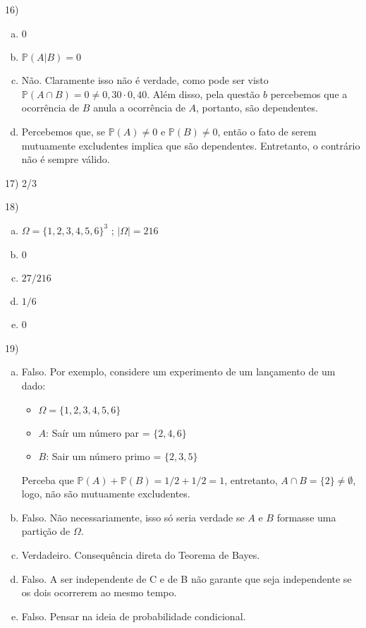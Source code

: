 \documentclass{article}
\begin{document}
16) 

\begin{enumerate}[a)]
    \item 0
    \item $\mathds{P}(A|B) = 0$
    \item Não. Claramente isso não é verdade, como pode ser visto $\mathds{P}(A \cap B) = 0 \neq 0,30 \cdot 0,40$. Além disso, pela questão $b$ percebemos que a ocorrência de $B$ anula a ocorrência de $A$, portanto, são dependentes. 
    \item Percebemos que, se $\mathds{P}(A) \neq 0$ e $\mathds{P}(B) \neq 0$, então o fato de serem mutuamente excludentes implica que são dependentes. Entretanto, o contrário não é sempre válido. 
\end{enumerate}

17) 2/3

18) 
\begin{enumerate}[a)]
    \item $\Omega = \{1,2,3,4,5,6\}^3$ ; $|\Omega| = 216$
    \item 0
    \item $27/216$
    \item $1/6$
    \item 0
\end{enumerate}

19) 
\begin{enumerate}[a)]
    \item Falso. Por exemplo, considere um experimento de um lançamento de um dado:
    \begin{itemize}
        \item $\Omega = \{1,2,3,4,5,6\}$
        \item $A$: Saír um número par = $\{2,4,6\}$
        \item $B$: Sair um número primo = $\{2,3,5\}$
    \end{itemize}

    Perceba que $\mathds{P}(A) + \mathds{P}(B) = 1/2 + 1/2 = 1$, entretanto, $A \cap B = \{2\} \neq \emptyset$, logo, não são mutuamente excludentes. 
    \item Falso. Não necessariamente, isso só seria verdade se $A$ e $B$ formasse uma partição de $\Omega$. 
    \item Verdadeiro. Consequência direta do Teorema de Bayes. 
    \item Falso. A ser independente de C e de B não garante que seja independente se os dois ocorrerem ao mesmo tempo. 
    \item Falso. Pensar na ideia de probabilidade condicional. 
\end{enumerate}
\end{document}
